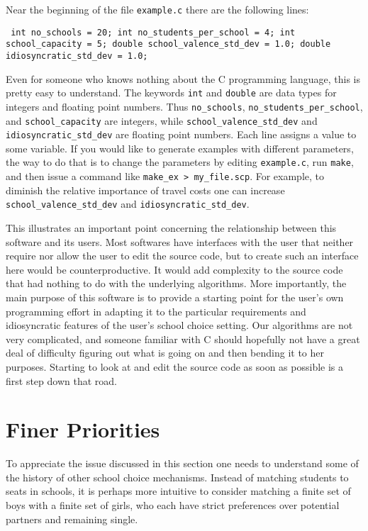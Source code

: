 \documentclass[12pt]{article}
\theoremstyle{definition}
\begin{document}
Near the beginning of the file \texttt{example.c} there are the following lines:
\begin{obeylines}\texttt{
  int no\_schools = 20;
  int no\_students\_per\_school = 4;
  int school\_capacity = 5;
  double school\_valence\_std\_dev = 1.0;
  double idiosyncratic\_std\_dev = 1.0;
}
\end{obeylines} \noindent
Even for someone who knows nothing about the C programming language,
this is pretty easy to understand.  The keywords \texttt{int} and
\texttt{double} are data types for integers and floating point
numbers.  Thus \texttt{no\_schools},
\texttt{no\_students\_per\_school}, and \texttt{school\_capacity} are
integers, while \texttt{school\_valence\_std\_dev} and
\texttt{idiosyncratic\_std\_dev} are floating point numbers.  Each
line assigns a value to some variable.  If you would like to generate
examples with different parameters, the way to do that is to change
the parameters by editing \texttt{example.c}, run \texttt{make}, and
then issue a command like \texttt{make\_ex > my\_file.scp}.  For
example, to diminish the relative importance of travel costs one can
increase \texttt{school\_valence\_std\_dev} and
\texttt{idiosyncratic\_std\_dev}.

This illustrates an important point concerning the relationship
between this software and its users.  Most softwares have interfaces
with the user that neither require nor allow the user to edit the
source code, but to create such an interface here would be
counterproductive. It would add complexity to the source code that had
nothing to do with the underlying algorithms.  More importantly, the
main purpose of this software is to provide a starting point for the
user's own programming effort in adapting it to the particular
requirements and idiosyncratic features of the user's school choice
setting.  Our algorithms are not very complicated, and someone
familiar with C should hopefully not have a great deal of difficulty
figuring out what is going on and then bending it to her purposes.
Starting to look at and edit the source code as soon as possible is a
first step down that road.


\section{Finer Priorities}

To appreciate the issue discussed in this section one needs to
understand some of the history of other school choice mechanisms.
Instead of matching students to seats in schools, it is perhaps more
intuitive to consider matching a finite set of boys with a finite set
of girls, who each have strict preferences over potential partners and
remaining single.
\end{document}
